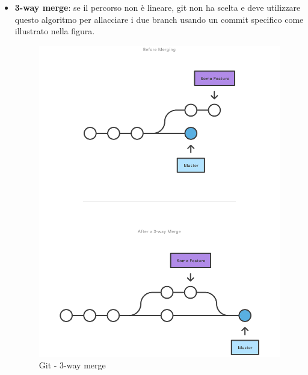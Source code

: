 \begin{enumerate}
\begin{itemize}
						\item \textbf{3-way merge}: se il percorso non è lineare, git non ha scelta e deve utilizzare questo algoritmo per allacciare i due branch usando un commit specifico come illustrato nella figura.
						\begin{figure}[htbp]
							\centering
							\includegraphics[scale=0.6]{images/3_way_merge.pdf}
							\caption{Git - 3-way merge}
							\label{fig:git_3_way_merge}
						\end{figure}
					\end{itemize}



\end{enumerate}
